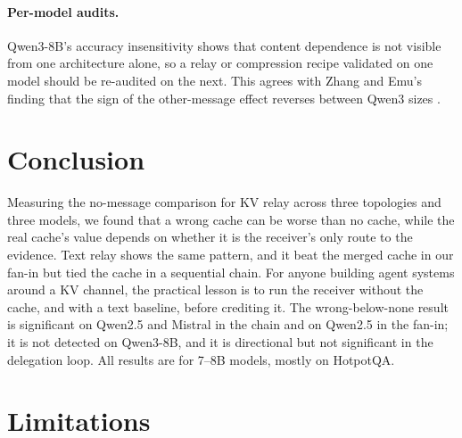 \documentclass[11pt]{article}
\begin{document}
\paragraph{Per-model audits.} Qwen3-8B's accuracy insensitivity shows that content
dependence is not visible from one architecture alone, so a relay or
compression recipe validated on one model should be re-audited on the
next. This agrees with Zhang and Emu's finding that the sign of the
other-message effect reverses between Qwen3 sizes \citep{zhangemu2026}.

\section{Conclusion}

Measuring the no-message comparison for KV relay across three topologies and
three models, we found that a wrong cache can be worse than no cache,
while the real cache's value depends on whether it is the receiver's only route
to the evidence. Text relay shows the same pattern, and it beat the merged cache
in our fan-in but tied the cache in a sequential chain. For
anyone building agent systems around a KV channel, the practical lesson is to
run the receiver without the cache, and with a text baseline, before crediting it.
The wrong-below-none result is significant on Qwen2.5 and Mistral in the chain
and on Qwen2.5 in the fan-in; it is not detected on Qwen3-8B, and it is
directional but not significant in the delegation loop. All results are for
7--8B models, mostly on HotpotQA.

\section*{Limitations}
\label{sec:limitations}
\end{document}
